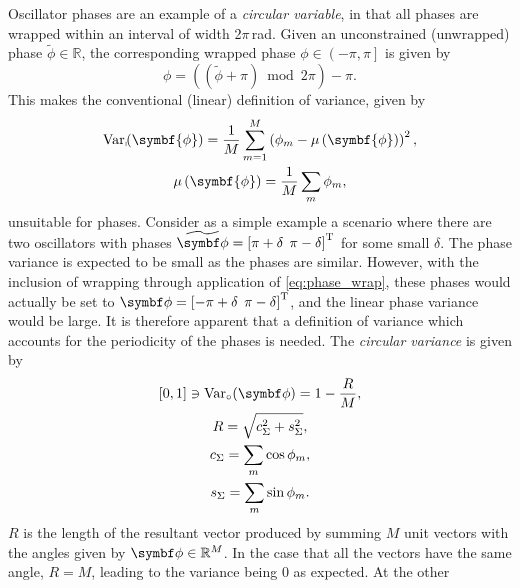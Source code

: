 Oscillator phases are an example of a \emph{circular variable}, in that all
phases are wrapped within an interval of width
2$\pi$\,\unit{\radian}. Given an
unconstrained (unwrapped) phase $\widetilde{\phi} \in \mathbb{R}$, the
corresponding wrapped phase $\phi \in \left( -\pi, \pi \right]$ is given by
\begin{equation}
    \phi = \left(\left(\widetilde{\phi} + \pi\right) \bmod 2 \pi\right) - \pi.
    \label{eq:phase_wrap}
\end{equation}
This makes the conventional (linear)
definition of variance, given by
\begin{subequations}
    \begin{gather}
        \Var_{\shortmid}\hspace*{-3pt}\left(\symbf{\phi}\right) =
            \frac{1}{M} \sum_{m=1}^{M} \left(\phi_m - \mu\left(\symbf{\phi}\right)\right)^2, \\
        \mu\left(\symbf{\phi}\right) = \frac{1}{M} \sum_{m} \phi_m,
    \end{gather}
\end{subequations}
unsuitable for phases. Consider as a simple example a scenario
where there are two oscillators with phases $\widetilde{\bdphi} = \left[ \pi +
\delta\:\:\pi - \delta \right]\T$ for some small $\delta$.
The phase variance is expected to be small as the phases are similar.
However, with the inclusion of wrapping through application of
\cref{eq:phase_wrap}, these phases would actually be set to $\bdphi = \left[
    -\pi
+ \delta\:\:\pi - \delta \right]\T$, and the linear phase
variance would be large. It is therefore apparent that a definition of variance
which accounts for the periodicity of the phases is needed. The \emph{circular
variance} is given by\cite[Chapter 3]{Fisher1993}
\begin{subequations}
    \begin{gather}
        [0, 1] \ni \circvar = 1 - \frac{R}{M},\\
        R = \sqrt{c_{\Sigma}^2 + s_{\Sigma}^2}, \\
        c_{\Sigma} = \sum_{m} \cos \phi_m, \\
        s_{\Sigma} = \sum_{m} \sin \phi_m.
    \end{gather}
\end{subequations}
$R$ is the length of the resultant vector produced by summing $M$ unit vectors
with the angles given by $\bdphi \in \mathbb{R}^M$. In the case that all the vectors have the
same angle, $R=M$, leading to the variance being $0$ as expected. At the other
